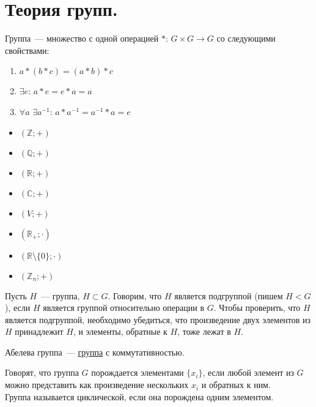 \documentclass{article}
\begin{document}
	\tableofcontents
	\setcounter{tocdepth}{3}
	\newpage
	\section{Теория групп.}
	\begin{definition}
		\label{group-def}
		Группа~--- множество с одной операцией $*$: $G \times G \rightarrow G$ со следующими свойствами:
		\begin{enumerate}
			\item $a * (b * c) = (a * b) * c$
			\item $\exists e$: $a * e = e * a = a$
			\item $\forall a$ $\exists a^{-1}$: $a * a^{-1} = a^{-1} * a = e$
		\end{enumerate}
	\end{definition}
	\begin{example}
		\begin{itemize}
			\item $(\mathbb{Z}; +)$
			\item $(\mathbb{Q}; +)$
			\item $(\mathbb{R}; +)$
			\item $(\mathbb{C}; +)$
			\item $(V; +)$
			\item $(\mathbb{R}_+; \cdot)$
			\item $(\mathbb{R} \setminus \{ 0 \}; \cdot)$
			\item $(\mathbb{Z}_n; +)$
		\end{itemize}
	\end{example}
	\begin{definition}
		Пусть $H$~--- группа, $H \subset G$. Говорим, что $H$ является подгруппой (пишем $H < G$), если $H$ является группой относительно операции в $G$. Чтобы проверить, что $H$ является подгруппой, необходимо убедиться, что произведение двух элементов из $H$ принадлежит $H$, и элементы, обратные к $H$, тоже лежат в $H$.
	\end{definition}
	\begin{definition}
		Абелева группа~--- \hyperref[group-def]{группа} с коммутативностью.
	\end{definition}
	\begin{definition}
		Говорят, что группа $G$ порождается элементами $\{ x_i \}$, если любой элемент из $G$ можно представить как произведение нескольких $x_i$ и обратных к ним. \\
		Группа называется циклической, если она порождена одним элементом.
	\end{definition}
\end{document}
